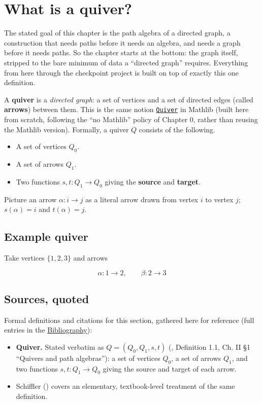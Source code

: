 \section{What is a quiver?}\label{sec:11-path-algebras:01-what-is-a-quiver:1}

The stated goal of this chapter is the path algebra of a directed graph, a construction that needs paths before it needs an algebra, and needs a graph before it needs paths. So the chapter starts at the bottom: the graph itself, stripped to the bare minimum of data a ``directed graph'' requires. Everything from here through the checkpoint project is built on top of exactly this one definition.

A \textbf{quiver} is a \emph{directed graph}: a set of vertices and a set of directed edges (called \textbf{arrows}) between them. This is the same notion \href{https://loogle.lean-lang.org/?q=Quiver}{\texttt{Quiver}} in Mathlib (built here from scratch, following the ``no Mathlib'' policy of Chapter 0, rather than reusing the Mathlib version). Formally, a quiver \(Q\) consists of the following.

\begin{itemize}
\tightlist
\item
  A set of vertices \(Q_0\).
\item
  A set of arrows \(Q_1\).
\item
  Two functions \(s, t : Q_1 \to Q_0\) giving the \textbf{source} and \textbf{target}.
\end{itemize}

Picture an arrow \(\alpha : i \to j\) as a literal arrow drawn from vertex \(i\) to vertex \(j\); \(s(\alpha) = i\) and \(t(\alpha) = j\).

\subsection{Example quiver}\label{sec:11-path-algebras:01-what-is-a-quiver:2}

Take vertices \(\{1, 2, 3\}\) and arrows

\[
\alpha : 1 \to 2, \qquad \beta : 2 \to 3
\]

\subsection{Sources, quoted}\label{sec:11-path-algebras:01-what-is-a-quiver:3}

Formal definitions and citations for this section, gathered here for reference (full entries in the \hyperref[sec:root:bibliography:1]{Bibliography}):

\begin{itemize}
\tightlist
\item
  \textbf{Quiver.} Stated verbatim as \(Q = (Q_0, Q_1, s, t)\) (\cite{AssemSimsonSkowronski2006}, Definition 1.1, Ch. II §1 ``Quivers and path algebras''): a set of vertices \(Q_0\), a set of arrows \(Q_1\), and two functions \(s, t : Q_1 \to Q_0\) giving the source and target of each arrow.
\item
  Schiffler (\cite{Schiffler2014}) covers an elementary, textbook-level treatment of the same definition.
\end{itemize}
